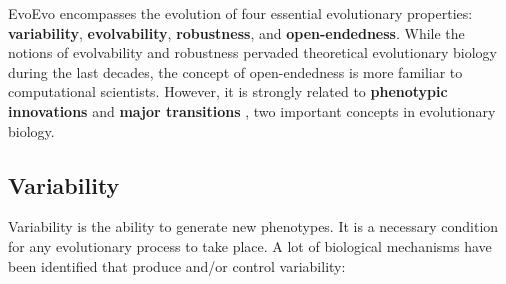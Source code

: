 EvoEvo encompasses the evolution of four essential evolutionary properties: \textbf{variability}, \textbf{evolvability}, \textbf{robustness}, and \textbf{open-endedness}. While the notions of evolvability and robustness pervaded theoretical evolutionary biology during the last decades, the concept of open-endedness is more familiar to computational scientists. However, it is strongly related to \textbf{phenotypic innovations} and \textbf{major transitions} \citep{smith-szathmary-1997}, two important concepts in evolutionary biology.


\subsection{Variability}
Variability is the ability to generate new phenotypes. It is a necessary condition for any evolutionary process to take place. A lot of biological mechanisms have been identified that produce and/or control variability:
